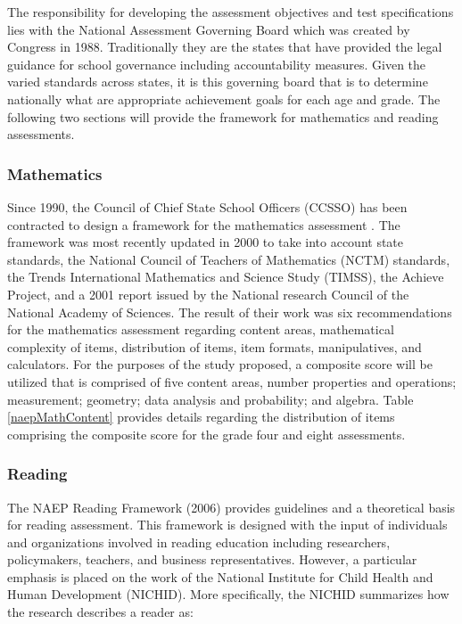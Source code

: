\documentclass[letterpaper,12p,twoside]{article} %
\begin{document}
The responsibility for developing the assessment objectives and test specifications lies with the National Assessment Governing Board which was created by Congress in 1988. Traditionally they are the states that have provided the legal guidance for school governance including accountability measures. Given the varied standards across states, it is this governing board that is to determine nationally what are appropriate achievement goals for each age and grade. The following two sections will provide the framework for mathematics and reading assessments.

\subsubsection{Mathematics}
Since 1990, the Council of Chief State School Officers (CCSSO) has been contracted to design a framework for the mathematics assessment \cite{naepmath}. The framework was most recently updated in 2000 to take into account state standards, the National Council of Teachers of Mathematics (NCTM) standards, the Trends International Mathematics and Science Study (TIMSS), the Achieve Project, and a 2001 report issued by the National research Council of the National Academy of Sciences. The result of their work was six recommendations for the mathematics assessment regarding content areas, mathematical complexity of items, distribution of items, item formats, manipulatives, and calculators. For the purposes of the study proposed, a composite score will be utilized that is comprised of five content areas, number properties and operations; measurement; geometry; data analysis and probability; and algebra. Table \ref{naepMathContent} provides details regarding the distribution of items comprising the composite score for the grade four and eight assessments.



\subsubsection{Reading}
The NAEP Reading Framework (2006) provides guidelines and a theoretical basis for reading assessment. This framework is designed with the input of individuals and organizations involved in reading education including researchers, policymakers, teachers, and business representatives. However, a particular emphasis is placed on the work of the National Institute for Child Health and Human Development (NICHID). More specifically, the NICHID summarizes how the research describes a reader as:
\end{document}
